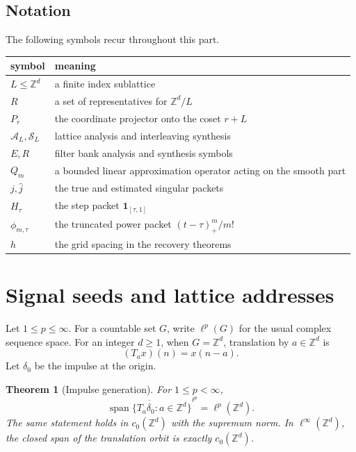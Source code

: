 \documentclass[11pt,letterpaper]{article}
\newtheorem{theorem}{Theorem}[section]
\theoremstyle{plain}
\theoremstyle{plain}
\theoremstyle{plain}
\theoremstyle{definition}
\theoremstyle{definition}
\theoremstyle{definition}
\theoremstyle{definition}
\theoremstyle{remark}
\theoremstyle{remark}
\theoremstyle{remark}
\theoremstyle{remark}
\newcommand{\ZZ}{\mathbb Z}
\newcommand{\Acal}{\mathcal A}
\newcommand{\Scal}{\mathcal S}
\newcommand{\one}{\mathbf 1}
\newcommand{\Span}{\operatorname{span}}
\let\KomorebiPrimitiveWidehat\widehat
\renewcommand{\widehat}[1]{\KomorebiPrimitiveWidehat{#1}}
\begin{document}
\subsection{Notation}

The following symbols recur throughout this part.
\begin{center}
\begin{tabular}{p{}p{}}
\toprule
symbol & meaning\\
\midrule
\(L\leq\ZZ^d\) & a finite index sublattice\\
\(R\) & a set of representatives for \(\ZZ^d/L\)\\
\(P_r\) & the coordinate projector onto the coset \(r+L\)\\
\(\Acal_L,\Scal_L\) & lattice analysis and interleaving synthesis\\
\(E,R\) & filter bank analysis and synthesis symbols\\
\(Q_m\) & a bounded linear approximation operator acting on the smooth part\\
\(j,\widehat j\) & the true and estimated singular packets\\
\(H_\tau\) & the step packet \(\one_{[\tau,1]}\)\\
\(\phi_{m,\tau}\) & the truncated power packet \((t-\tau)_+^m/m!\)\\
\(h\) & the grid spacing in the recovery theorems\\
\bottomrule
\end{tabular}
\end{center}

\section{Signal seeds and lattice addresses}\label{extension:section:02}\label{sec:signal_seeds}

Let \(1\leq p\leq\infty\). For a countable set \(G\), write \(\ell^p(G)\) for the usual complex sequence space. For an integer \(d\geq1\), when \(G=\ZZ^d\), translation by \(a\in\ZZ^d\) is
\[
(T_ax)(n)=x(n-a).
\]
Let \(\delta_0\) be the impulse at the origin.

\begin{theorem}[Impulse generation]\label{thm:impulse_generation}
For \(1\leq p<\infty\),
\[
\overline{\Span\{T_a\delta_0:a\in\ZZ^d\}}^{\ell^p}
=
\ell^p(\ZZ^d).
\]
The same statement holds in \(c_0(\ZZ^d)\) with the supremum norm. In \(\ell^\infty(\ZZ^d)\), the closed span of the translation orbit is exactly \(c_0(\ZZ^d)\).
\end{theorem}
\end{document}
